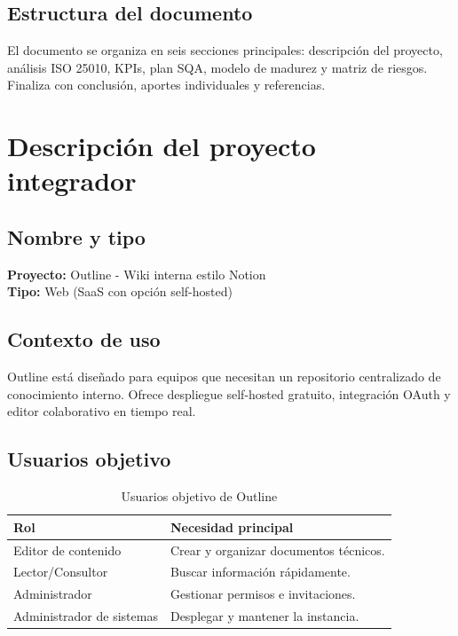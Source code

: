 \documentclass[12pt]{article}
\begin{document}
\subsection{Estructura del documento}
El documento se organiza en seis secciones principales: descripción del proyecto, análisis ISO 25010, KPIs, plan SQA, modelo de madurez y matriz de riesgos. Finaliza con conclusión, aportes individuales y referencias.

\section{Descripción del proyecto integrador}

\subsection{Nombre y tipo}
\textbf{Proyecto:} Outline - Wiki interna estilo Notion \\
\textbf{Tipo:} Web (SaaS con opción self-hosted)

\subsection{Contexto de uso}
Outline está diseñado para equipos que necesitan un repositorio centralizado de conocimiento interno. Ofrece despliegue self-hosted gratuito, integración OAuth y editor colaborativo en tiempo real.

\subsection{Usuarios objetivo}
\begin{table}[H]
\centering
\begin{tabularx}{\textwidth}{|l|X|}
\hline
\textbf{Rol} & \textbf{Necesidad principal} \\ \hline
Editor de contenido & Crear y organizar documentos técnicos. \\ \hline
Lector/Consultor & Buscar información rápidamente. \\ \hline
Administrador & Gestionar permisos e invitaciones. \\ \hline
Administrador de sistemas & Desplegar y mantener la instancia. \\ \hline
\end{tabularx}
\caption{Usuarios objetivo de Outline}
\end{table}
\end{document}

